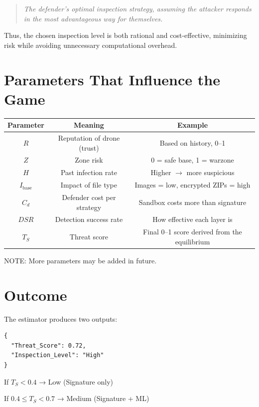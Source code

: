 \documentclass[12pt, a4paper]{report}
\begin{document}
\begin{quote}
\textit{The defender’s optimal inspection strategy, assuming the attacker responds in the most advantageous way for themselves.}
\end{quote}

Thus, the chosen inspection level is both rational and cost-effective, minimizing risk while avoiding unnecessary computational overhead.


\section{Parameters That Influence the Game}

\begin{table}[h!]
\centering
\begin{tabular}{|c|c|c|}
\hline
\textbf{Parameter} & \textbf{Meaning} & \textbf{Example} \\ \hline
$R$ & Reputation of drone (trust) & Based on history, 0--1 \\ \hline
$Z$ & Zone risk & 0 = safe base, 1 = warzone \\ \hline
$H$ & Past infection rate & Higher $\rightarrow$ more suspicious \\ \hline
$I_{\text{base}}$ & Impact of file type & Images = low, encrypted ZIPs = high \\ \hline
$C_d$ & Defender cost per strategy & Sandbox costs more than signature \\ \hline
$DSR$ & Detection success rate & How effective each layer is \\ \hline
$T_S$ & Threat score & Final 0--1 score derived from the equilibrium \\ \hline
\end{tabular}
\end{table}

\noindent NOTE: More parameters may be added in future.

\section{Outcome}

The estimator produces two outputs:

\begin{verbatim}
{
  "Threat_Score": 0.72,
  "Inspection_Level": "High"
}
\end{verbatim}

If $T_S < 0.4$ → Low (Signature only)

If $0.4 \leq T_S < 0.7$ → Medium (Signature + ML)
\end{document}
